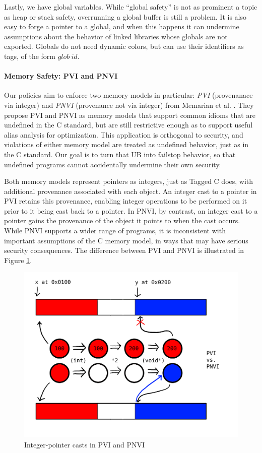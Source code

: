 \documentclass[acmsmall,review,anonymous]{acmart}\settopmatter{printfolios=true,printccs=false,printacmref=false}
\begin{document}
Lastly, we have global variables. While ``global safety'' is not as prominent a topic as heap or
stack safety, overrunning a global buffer is still a problem. It is also easy to forge a pointer to a global,
and when this happens it can undermine assumptions about the behavior of linked libraries whose globals
are not exported. Globals do not need dynamic colors, but can use their identifiers as tags, of the form
\(\mathit{glob} ~ id\).

\paragraph{Memory Safety: PVI and PNVI}

Our policies aim to enforce two memory models in particular: {\it PVI} (provenanace via integer) and
{\it PNVI} (provenance not via integer) from Memarian et al. \cite{???}. They propose PVI and PNVI
as memory models that support common idioms that are undefined in the C standard, but are still restrictive
enough as to support useful alias analysis for optimization. This application is orthogonal to
security, and violations of either memory model are treated as undefined behavior, just as in the
C standard. Our goal is to turn that UB into failstop behavior, so that undefined programs cannot accidentally
undermine their own security.

Both memory models represent pointers as integers, just as Tagged C does, with additional provenance
associated with each object. An integer cast to a pointer in PVI retains this provenance, enabling
integer operations to be performed on it prior to it being cast back to a pointer.
In PNVI, by contrast, an integer cast to a pointer gains the provenance of the object it points
to when the cast occurs. While PNVI supports a wider range of programs, it is inconsistent with important
assumptions of the C memory model, in ways that may have serious security consequences.
The difference between PVI and PNVI is illustrated in Figure \ref{fig:PVI-PNVI}.

\begin{figure}
  \includegraphics[width=.6\textwidth]{PVIvsPNVI.png}
  \caption{Integer-pointer casts in PVI and PNVI}
  \label{fig:PVI-PNVI}
\end{figure}
\end{document}
